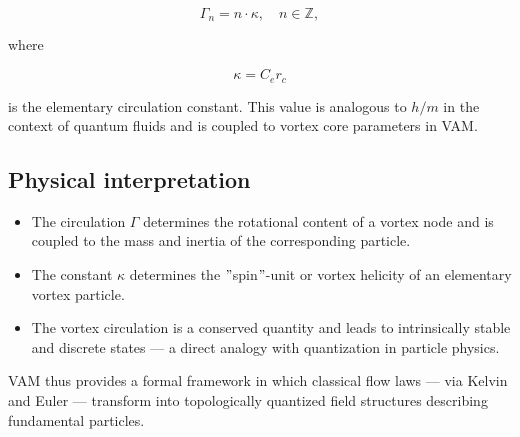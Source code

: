 \begin{equation}
    \Gamma_n = n \cdot \kappa, \quad n \in \mathbb{Z},
\end{equation}

where

\begin{equation}
    \kappa = C_e r_c
\end{equation}

is the elementary circulation constant. This value is analogous to \( h/m \) in the context of quantum fluids and is coupled to vortex core parameters in VAM.

\subsection{Physical interpretation}

\begin{itemize}
    \item The circulation \( \Gamma \) determines the rotational content of a vortex node and is coupled to the mass and inertia of the corresponding particle.

    \item The constant \( \kappa \) determines the \("\)spin\("\)-unit or vortex helicity of an elementary vortex particle.
    \item The vortex circulation is a conserved quantity and leads to intrinsically stable and discrete states — a direct analogy with quantization in particle physics.
\end{itemize}

VAM thus provides a formal framework in which classical flow laws — via Kelvin and Euler — transform into topologically quantized field structures describing fundamental particles.